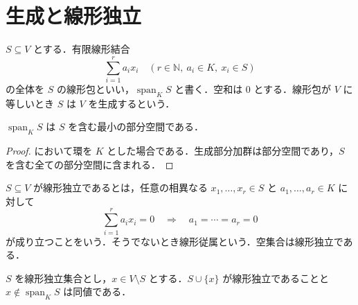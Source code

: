 \section{生成と線形独立}
\begin{defn}[線形包]
$S\subseteq V$ とする．有限線形結合
\[
\sum_{i=1}^r a_ix_i\quad(r\in\mathbb N,\ a_i\in K,\ x_i\in S)
\]
の全体を $S$ の線形包といい，$\operatorname{span}_K S$ と書く．空和は $0$ とする．線形包が $V$ に等しいとき $S$ は $V$ を生成するという．
\end{defn}
\begin{prop}[線形包の最小性]
$\operatorname{span}_K S$ は $S$ を含む最小の部分空間である．
\end{prop}
\begin{proof}
において環を $K$ とした場合である．生成部分加群は部分空間であり，$S$ を含む全ての部分空間に含まれる．
\end{proof}
\begin{defn}[線形独立]
$S\subseteq V$ が線形独立であるとは，任意の相異なる $x_1,\ldots,x_r\in S$ と $a_1,\ldots,a_r\in K$ に対して
\[
\sum_{i=1}^r a_ix_i=0\quad\Longrightarrow\quad a_1=\cdots=a_r=0
\]
が成り立つことをいう．そうでないとき線形従属という．空集合は線形独立である．
\end{defn}
\begin{prop}[線形独立集合への一元添加]
$S$ を線形独立集合とし，$x\in V\setminus S$ とする．$S\cup\{x\}$ が線形独立であることと $x\notin\operatorname{span}_K S$ は同値である．
\end{prop}
